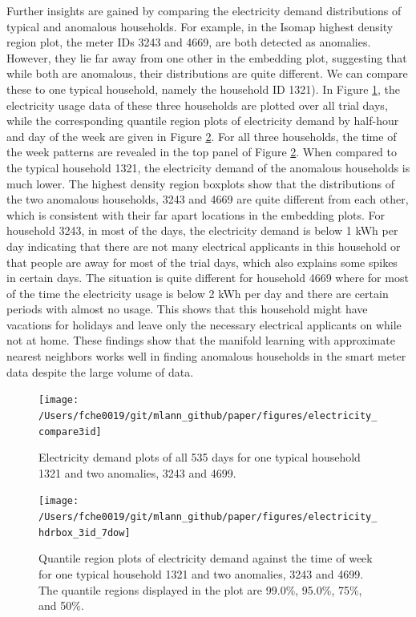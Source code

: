 \documentclass[11pt,a4paper,]{article}
\begin{document}
Further insights are gained by comparing the electricity demand distributions of typical and anomalous households. For example, in the Isomap highest density region plot, the meter IDs 3243 and 4669, are both detected as anomalies. However, they lie far away from one other in the embedding plot, suggesting that while both are anomalous, their distributions are quite different. We can compare these to one typical household, namely the household ID 1321). In Figure \ref{fig:compare3ids}, the electricity usage data of these three households are plotted over all trial days, while the corresponding quantile region plots of electricity demand by half-hour and day of the week are given in Figure \ref{fig:hdrboxplot3ids}. For all three households, the time of the week patterns are revealed in the top panel of Figure \ref{fig:hdrboxplot3ids}. When compared to the typical household 1321, the electricity demand of the anomalous households is much lower. The highest density region boxplots show that the distributions of the two anomalous households, 3243 and 4669 are quite different from each other, which is consistent with their far apart locations in the embedding plots. For household 3243, in most of the days, the electricity demand is below 1 kWh per day indicating that there are not many electrical applicants in this household or that people are away for most of the trial days, which also explains some spikes in certain days. The situation is quite different for household 4669 where for most of the time the electricity usage is below 2 kWh per day and there are certain periods with almost no usage. This shows that this household might have vacations for holidays and leave only the necessary electrical applicants on while not at home. These findings show that the manifold learning with approximate nearest neighbors works well in finding anomalous households in the smart meter data despite the large volume of data.

\begin{figure}

{\centering \texttt{[image: /Users/fche0019/git/mlann\_github/paper/figures/electricity\_compare3id]} 

}

\caption{Electricity demand plots of all 535 days for one typical household 1321 and two anomalies, 3243 and 4699. }\label{fig:compare3ids}
\end{figure}
\begin{figure}

{\centering \texttt{[image: /Users/fche0019/git/mlann\_github/paper/figures/electricity\_hdrbox\_3id\_7dow]} 

}

\caption{Quantile region plots of electricity demand against the time of week for one typical household 1321 and two anomalies, 3243 and 4699. The quantile regions displayed in the plot are 99.0\%, 95.0\%, 75\%, and 50\%. }\label{fig:hdrboxplot3ids}
\end{figure}
\end{document}
